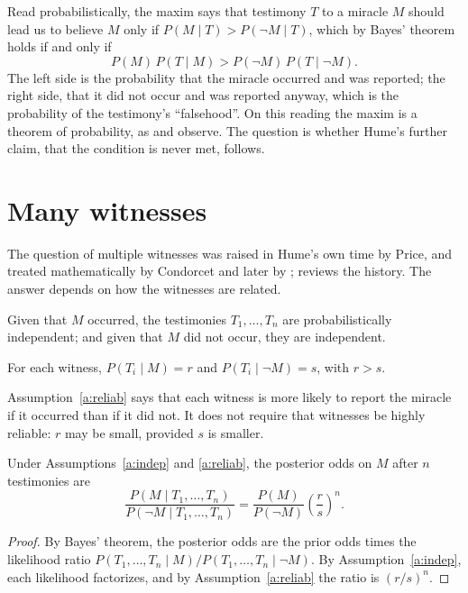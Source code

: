 \documentclass{situationist-preprint}
\begin{document}
Read probabilistically, the maxim says that testimony $T$ to a miracle $M$ should lead us to believe $M$ only if $P(M \mid T) > P(\neg M \mid T)$, which by Bayes' theorem holds if and only if
\[
P(M)\,P(T \mid M) > P(\neg M)\,P(T \mid \neg M).
\]
The left side is the probability that the miracle occurred and was reported; the right side, that it did not occur and was reported anyway, which is the probability of the testimony's \enquote{falsehood}. On this reading the maxim is a theorem of probability, as \citet{Sobel1991} and \citet{Earman2000} observe. The question is whether Hume's further claim, that the condition is never met, follows.

\section{Many witnesses}

The question of multiple witnesses was raised in Hume's own time by Price, and treated mathematically by Condorcet and later by \citet{Babbage1837}; \citet{Owen1987} reviews the history. The answer depends on how the witnesses are related.

\begin{assumption}\label{a:indep}
Given that $M$ occurred, the testimonies $T_1, \dots, T_n$ are probabilistically independent; and given that $M$ did not occur, they are independent.
\end{assumption}

\begin{assumption}[Reliability]\label{a:reliab}
For each witness, $P(T_i \mid M) = r$ and $P(T_i \mid \neg M) = s$, with $r > s$.
\end{assumption}

Assumption~\ref{a:reliab} says that each witness is more likely to report the miracle if it occurred than if it did not. It does not require that witnesses be highly reliable: $r$ may be small, provided $s$ is smaller.

\begin{proposition}\label{p:threshold}
Under Assumptions~\ref{a:indep} and \ref{a:reliab}, the posterior odds on $M$ after $n$ testimonies are
\[
\frac{P(M \mid T_1, \dots, T_n)}{P(\neg M \mid T_1,\dots,T_n)} = \frac{P(M)}{P(\neg M)} \left(\frac{r}{s}\right)^n .
\]
\end{proposition}

\begin{proof}
By Bayes' theorem, the posterior odds are the prior odds times the likelihood ratio $P(T_1,\dots,T_n \mid M)/P(T_1,\dots,T_n \mid \neg M)$. By Assumption~\ref{a:indep}, each likelihood factorizes, and by Assumption~\ref{a:reliab} the ratio is $(r/s)^n$.
\end{proof}
\end{document}
